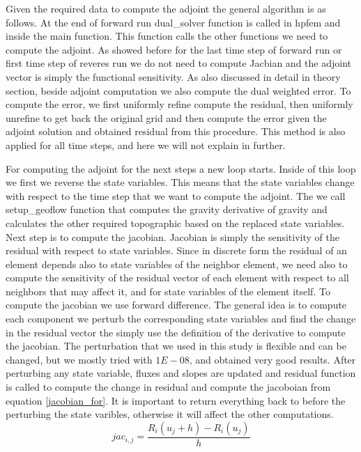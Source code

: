 \documentclass[a4paper,10pt]{article}
\begin{document}
Given the required data to compute the adjoint the general algorithm is as follows. At the end of forward run dual\_solver function is called in hpfem and inside the main function. This function calls the other functions we need to compute the adjoint. As showed before for the last time step of forward run or first time step of reveres run we do not need to compute Jacbian and the adjoint vector is simply the functional sensitivity. As also discussed in detail in theory section, beside adjoint computation we also compute the dual weighted error. To compute the error, we first uniformly refine compute the residual, then uniformly unrefine to get back the original grid and then compute the error given the adjoint solution and obtained residual from this procedure. This method is also applied for all time steps, and here we will not explain in further. 

For computing the adjoint for the next steps a new loop starts. Inside of this loop we first we reverse the state variables. This means that the state variables change with respect to the time step that we want to compute the adjoint. The we call setup\_geoflow function that computes the gravity derivative of gravity and calculates the other required topographic based on the replaced state variables. Next step is to compute the jacobian. Jacobian is simply the sensitivity of the residual with respect to state variables. Since in discrete form the residual of an element depends also to state variables of the neighbor element, we need also to compute the sensitivity of the residual vector of each element with respect to all neighbors that may affect it, and for state variables of the element itself. To compute the jacobian we use forward difference. The general idea is to compute each component we perturb the corresponding state variables and find the change in the residual vector the simply use the definition of the derivative to compute the jacobian. The perturbation that we used in this study is flexible and can be changed, but we mostly tried with $1E-08$, and obtained very good results.
After perturbing any state variable, fluxes and slopes are updated and residual function is called to compute the change in residual and compute the jacoboian from equation \ref{jacobian_for}. It is important to return everything back to before the perturbing the state varibles, otherwise it will affect the other computations.\newline
\begin{equation}\label{jacobian_for}
jac_{i,j}=\frac{R_i(u_j+h)-R_i(u_j)}{h}
\end{equation}
\end{document}
